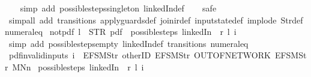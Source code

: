 \begin{isabellebody}
%
\isadelimproof
\ \ %
\endisadelimproof
%
\isatagproof
{}\isamarkupfalse%
\ {\isacharparenleft}simp\ add{\isacharcolon}\ possible{\isacharunderscore}steps{\isacharunderscore}singleton\ linkedIn{\isacharunderscore}def{\isacharparenright}\isanewline
\ \ \isamarkupfalse%
\ safe\isanewline
\ \ \isamarkupfalse%
\ {\isacharparenleft}simp{\isacharunderscore}all\ add{\isacharcolon}\ transitions\ apply{\isacharunderscore}guards{\isacharunderscore}def\ join{\isacharunderscore}ir{\isacharunderscore}def\ input{}state{\isacharunderscore}def\ implode\ Str{\isacharunderscore}def\ numeral{\isacharunderscore}{}{\isacharunderscore}eq{\isacharunderscore}{}{\isacharparenright}%
\endisatagproof
{\isafoldproof}%
%
\isadelimproof
\isanewline
%
\endisadelimproof
\isanewline
{}\isamarkupfalse%
\ not{\isacharunderscore}pdf{\isacharunderscore}{}{\isacharcolon}\ {\isachardoublequoteopen}l\ {\isasymnoteq}\ STR\ {\isacharprime}{\isacharprime}pdf{\isacharprime}{\isacharprime}\ {\isasymLongrightarrow}\ possible{\isacharunderscore}steps\ linkedIn\ {}\ r\ l\ i\ {\isacharequal}\ {\isacharbraceleft}{\isacharbar}{\isacharbar}{\isacharbraceright}{\isachardoublequoteclose}\isanewline
%
\isadelimproof
\ \ %
\endisadelimproof
%
\isatagproof
{}\isamarkupfalse%
\ {\isacharparenleft}simp\ add{\isacharcolon}\ possible{\isacharunderscore}steps{\isacharunderscore}empty\ linkedIn{\isacharunderscore}def\ transitions\ numeral{\isacharunderscore}{}{\isacharunderscore}eq{\isacharunderscore}{}{\isacharparenright}%
\endisatagproof
{\isafoldproof}%
%
\isadelimproof
\isanewline
%
\endisadelimproof
\isanewline
{}\isamarkupfalse%
\ pdf{\isacharunderscore}{}{\isacharunderscore}invalid{\isacharunderscore}inputs{\isacharcolon}\ {\isachardoublequoteopen}i\ {\isasymnoteq}\ {\isacharbrackleft}EFSM{\isachardot}Str\ {\isacharprime}{\isacharprime}otherID{\isacharprime}{\isacharprime}{\isacharcomma}\ EFSM{\isachardot}Str\ {\isacharprime}{\isacharprime}OUT{\isacharunderscore}OF{\isacharunderscore}NETWORK{\isacharprime}{\isacharprime}{\isacharcomma}\ EFSM{\isachardot}Str\ {\isacharprime}{\isacharprime}MNn{}{\isacharprime}{\isacharprime}{\isacharbrackright}\ {\isasymLongrightarrow}\isanewline
possible{\isacharunderscore}steps\ linkedIn\ {}\ r\ l\ i\ {\isacharequal}\ {\isacharbraceleft}{\isacharbar}{\isacharbar}{\isacharbraceright}{\isachardoublequoteclose}\isanewline
%
\isadelimproof
\ \ %
\endisadelimproof
%
\isatagproof

\end{isabellebody}
